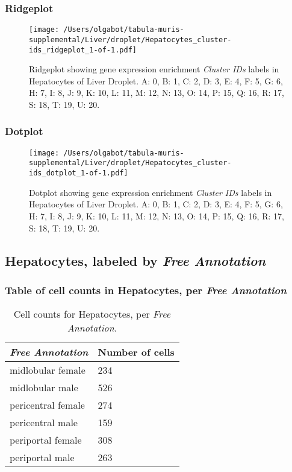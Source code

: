 \clearpage

\subsubsection{Ridgeplot}
\begin{figure}[h]
\centering
\texttt{[image: /Users/olgabot/tabula-muris-supplemental/Liver/droplet/Hepatocytes\_cluster-ids\_ridgeplot\_1-of-1.pdf]}

\caption{ Ridgeplot  showing gene expression enrichment \emph{Cluster IDs} labels in Hepatocytes of Liver Droplet. A: 0, B: 1, C: 2, D: 3, E: 4, F: 5, G: 6, H: 7, I: 8, J: 9, K: 10, L: 11, M: 12, N: 13, O: 14, P: 15, Q: 16, R: 17, S: 18, T: 19, U: 20.}
\end{figure}


\clearpage

\subsubsection{Dotplot}
\begin{figure}[h]
\centering
\texttt{[image: /Users/olgabot/tabula-muris-supplemental/Liver/droplet/Hepatocytes\_cluster-ids\_dotplot\_1-of-1.pdf]}

\caption{ Dotplot  showing gene expression enrichment \emph{Cluster IDs} labels in Hepatocytes of Liver Droplet. A: 0, B: 1, C: 2, D: 3, E: 4, F: 5, G: 6, H: 7, I: 8, J: 9, K: 10, L: 11, M: 12, N: 13, O: 14, P: 15, Q: 16, R: 17, S: 18, T: 19, U: 20.}
\end{figure}


\clearpage

\subsection{Hepatocytes, labeled by \emph{Free Annotation}}
\subsubsection{Table of cell counts in Hepatocytes, per \emph{Free Annotation}}\begin{table}[h]
\centering
\label{my-label}
\begin{tabular}{@{}ll@{}}
\toprule

\emph{Free Annotation}& Number of cells \\ \midrule
midlobular female & 234 \\

midlobular male & 526 \\

pericentral female & 274 \\

pericentral male & 159 \\

periportal female & 308 \\

periportal male & 263 \\
\bottomrule
\end{tabular}
\caption{Cell counts for Hepatocytes, per \emph{Free Annotation}.}
\end{table}

